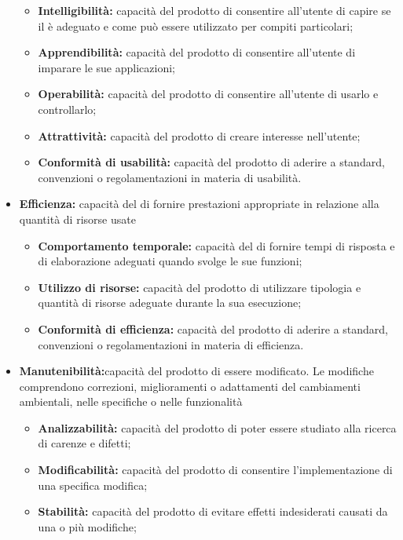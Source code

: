 \documentclass[12pt,a4paper]{article}
\begin{document}
\begin{itemize}
	\begin{itemize}
		\item \textbf{Intelligibilità:} capacità del prodotto   di consentire all'utente di capire se il   è adeguato e come può essere utilizzato per compiti	particolari;
		\item \textbf{Apprendibilità:} capacità del prodotto   di consentire all'utente di imparare le sue applicazioni;
		\item \textbf{Operabilità:} capacità del prodotto   di consentire all'utente di usarlo e controllarlo;
		\item \textbf{Attrattività:} capacità del prodotto   di creare interesse nell'utente;
		\item \textbf{Conformità di usabilità:} capacità del prodotto   di aderire a standard, convenzioni o regolamentazioni in materia di usabilità.
	\end{itemize}
	\item \textbf{Efficienza:} capacità del   di fornire prestazioni appropriate in relazione alla quantità di risorse usate
	\begin{itemize}
		\item \textbf{Comportamento temporale:} capacità del   di fornire tempi di risposta e di elaborazione adeguati quando svolge le sue funzioni;
		\item \textbf{Utilizzo di risorse:} capacità del prodotto   di utilizzare tipologia e quantità di risorse adeguate durante la sua esecuzione;
		\item \textbf{ Conformità di efficienza: } capacità del prodotto   di aderire a standard, convenzioni o regolamentazioni in materia di efficienza.
	\end{itemize}
	\item \textbf{Manutenibilità:}capacità del prodotto   di essere modificato. Le modifiche comprendono correzioni, miglioramenti o adattamenti del   cambiamenti ambientali, nelle specifiche o nelle funzionalità
	\begin{itemize}
		\item \textbf{Analizzabilità:} capacità del prodotto   di poter essere studiato alla ricerca di carenze e difetti;
		\item \textbf{Modificabilità: }capacità del prodotto   di consentire l'implementazione di una specifica modifica;
		\item \textbf{ Stabilità:} capacità del prodotto   di evitare effetti indesiderati causati da una o più modifiche;

\end{itemize}
\end{itemize}
\end{document}
